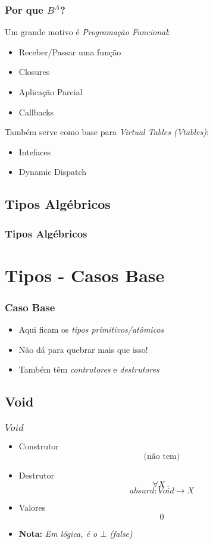 \documentclass{beamer}
\newcommand{\nota}[1]{\textbf{Nota:}\textit{ #1}}
\renewcommand{\d}{\:.\:}
\begin{document}
\begin{frame}
    \frametitle{Por que \(B^A\)?}
    Um grande motivo é \emph{Programação Funcional}:
    \begin{itemize}
        \item Receber/Passar uma função
        \item Closures
        \item Aplicação Parcial
        \item Callbacks
    \end{itemize}
    \vfill
    \pause
    Também serve como base para
    \emph{Virtual Tables} \emph{(Vtables)}:
    \begin{itemize}
        \item Intefaces
        \item Dynamic Dispatch
    \end{itemize}
\end{frame}

\subsection{Tipos Algébricos}
\begin{frame}
    \frametitle{Tipos Algébricos}
\end{frame}

\section{Tipos - Casos Base}
\begin{frame}
    \frametitle{Caso Base}
    \begin{itemize}
        \item Aqui ficam os \emph{tipos primitivos/atômicos}
            \vfill
        \item Não dá para quebrar mais que isso!
            \vfill
        \item Também têm \emph{contrutores} e \emph{destrutores}
    \end{itemize}
\end{frame}

\subsection{Void}
\begin{frame}
    \frametitle{\(Void\)}
      {
        \begin{itemize}
            \item Construtor
                \[
                    \text{(não tem)}
                \]
                \vfill
            \item Destrutor
                \[
                    \forall X \d
                \] \[
                    absurd : Void \to X
                \]
                \vfill
            \item Valores
                \[
                    0
                \]
                \vfill
            \item \nota{Em lógica, é o \(\bot\) \emph{(false)}}
        \end{itemize}
    }
\end{frame}
\end{document}
